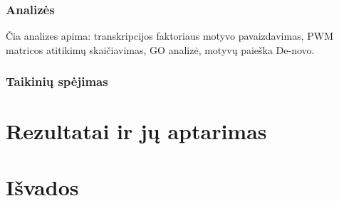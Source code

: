 \documentclass[12pt]{article}
\begin{document}
\subsubsection*{Analizės}

Čia analizes apima: transkripcijos faktoriaus motyvo pavaizdavimas, PWM
matricos atitikimų skaičiavimas, GO analizė, motyvų paieška De-novo.

\subsubsection*{Taikinių spėjimas}

\newpage


\section{Rezultatai ir jų aptarimas}
\newpage


\section{Išvados}
\newpage

\end{document}
